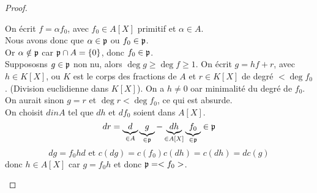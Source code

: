 \begin{proof}
\begin{itemize}
		      On écrit $f = \alpha f_0$, avec $f_0 \in A[X]$ primitif et $\alpha \in A$.\\
		      Nous avons donc que $\alpha \in \mathfrak{p}$ ou $f_0 \in \mathfrak{p}$. \\
		      Or $\alpha \notin \mathfrak{p}$ car $\mathfrak{p} \cap A = \{0\}$, donc $f_0 \in \mathfrak{p}$.\\
		      Suppososns $g \in \mathfrak{p}$ non nu, alors $ \deg g \geq \deg f \geq 1$.
		      On écrit $g = hf + r$, avec $h \in K[X]$, ou $K$ est le corps des fractions de $A$ et $r \in K[X]$ de degré $< \deg f_0$.
		      (Division euclidienne dans $K[X]$).
		      On a $h \neq 0$ oar minimalité du degré de $f_0$. On aurait sinon
		      $g = r$ et $\deg r < \deg f_0$, ce qui est absurde.\\
		      On choisit $d in A$ tel que $dh$ et $df_0$ soient dans $A[X]$.\\
		      $$ dr = \underbrace{d}_{\in A} \underbrace{g}_{\in \mathfrak{p}} - \underbrace{dh}_{\in A[X]} \underbrace{f_0}_{\in \mathfrak{p}} \in \mathfrak{p}$$
		      $$ dg =f_0hd \text{ et } c(dg) = c(f_0)c(dh) = c(dh) = dc(g)$$
		      donc $h \in A[X]$ car $g = f_0h$ et donc $\mathfrak{p} = <f_0>$.
	\end{itemize}
\end{proof}


